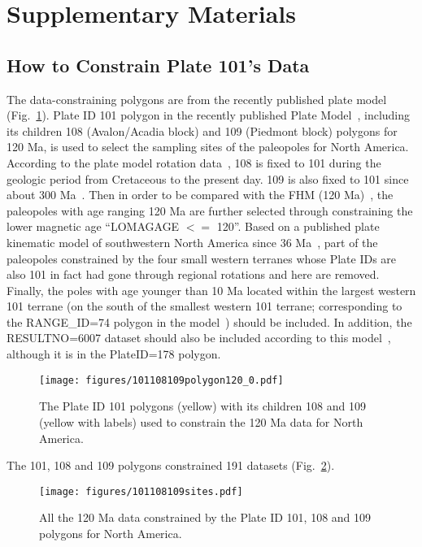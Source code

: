 \section{Supplementary Materials}

\subsection{How to Constrain Plate 101's Data}
The data-constraining polygons are from the recently published plate
model~\cite{Y18} (Fig.~\ref{fig_NApolygon}).
Plate ID 101 polygon in the recently published Plate Model~\cite{Y18}, including
its children 108 (Avalon/Acadia block) and 109 (Piedmont block) polygons for
120 Ma, is used to select the sampling sites of the paleopoles for
North America. According to the plate model rotation data~\cite{Y18}, 108 is
fixed to 101 during the geologic period from Cretaceous to the present day. 109
is also fixed to 101 since about 300 Ma~\cite{C14}. Then in order to be compared
with the FHM (120 Ma)~\cite{M93,M99}, the paleopoles with age
ranging 120 Ma are further selected through constraining the lower
magnetic age ``LOMAGAGE $<=$ 120''. Based on a published plate kinematic model
of southwestern North America since 36 Ma~\cite{Mc06}, part of the paleopoles
constrained by the four small western terranes whose Plate IDs are also 101 in
fact had gone through regional rotations and here are removed. Finally, the
poles with age younger than 10 Ma located within the largest western 101 terrane
(on the south of the smallest western 101 terrane; corresponding to the
RANGE\_ID=74 polygon in the model~\cite{Mc06}) should be included. In addition,
the RESULTNO=6007 dataset should also be included according to this
model~\cite{Mc06}, although it is in the PlateID=178 polygon.

\begin{figure}
\texttt{[image: figures/101108109polygon120\_0.pdf]}
\caption{The Plate ID 101 polygons (yellow) with its children 108 and 109
(yellow with labels) used to constrain the 120 Ma data for North
America.}\label{fig_NApolygon}
\end{figure}

The 101, 108 and 109 polygons constrained 191 datasets (Fig.~\ref{fig_NApmdata}).

\begin{figure}
\texttt{[image: figures/101108109sites.pdf]}
\caption{All the 120 Ma data constrained by the Plate ID 101, 108
and 109 polygons for North America.}\label{fig_NApmdata}
\end{figure}

